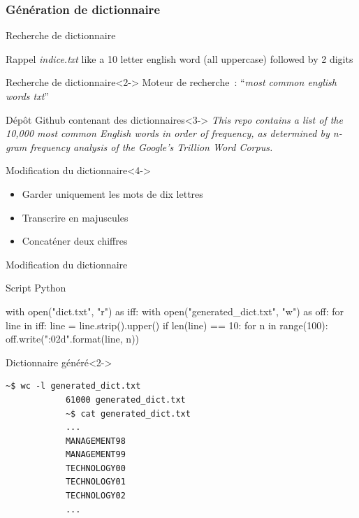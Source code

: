 \documentclass[10pt,sans,usenames,dvipsnames,french,compress]{beamer}
\begin{document}
\subsubsection{Génération de dictionnaire}
\begin{frame}{Recherche de dictionnaire}
	\begin{block}{Rappel \textit{indice.txt}}
		like a 10 letter english word (all uppercase) followed by 2 digits
	\end{block}

	\begin{block}{Recherche de dictionnaire}<2->
		Moteur de recherche : ``\textit{most common english words txt}''
	\end{block}

	\begin{exampleblock}{Dépôt Github contenant des dictionnaires}<3->
		\textit{This repo contains a list of the 10,000 most common English words in order of frequency, as determined by n-gram frequency analysis of the Google's Trillion Word Corpus.}
	\end{exampleblock}

	\begin{block}{Modification du dictionnaire}<4->
		\begin{itemize}
			\item Garder uniquement les mots de dix lettres
			\item Transcrire en majuscules
			\item Concaténer deux chiffres
		\end{itemize}
	\end{block}
\end{frame}

\begin{frame}[fragile]{Modification du dictionnaire}
	\vspace{-1mm}
	\begin{block}{Script Python}
		\begin{python}
			with open("dict.txt", "r") as iff:
				with open("generated_dict.txt", "w") as off:
					for line in iff:
						line = line.strip().upper()
						if len(line) == 10:
							for n in range(100):
								off.write("{}{:02d}\n".format(line, n))
		\end{python}
		\vspace{-2mm}
	\end{block}
	\vspace{-1mm}
	\begin{block}{Dictionnaire généré}<2->
		\vspace{-3mm}
		\begin{lstlisting}[style=Term]
			~$ wc -l generated_dict.txt
			61000 generated_dict.txt
			~$ cat generated_dict.txt
			...
			MANAGEMENT98
			MANAGEMENT99
			TECHNOLOGY00
			TECHNOLOGY01
			TECHNOLOGY02
			...
		\end{lstlisting}
		\vspace{-2mm}
	\end{block}
\end{frame}
\end{document}
